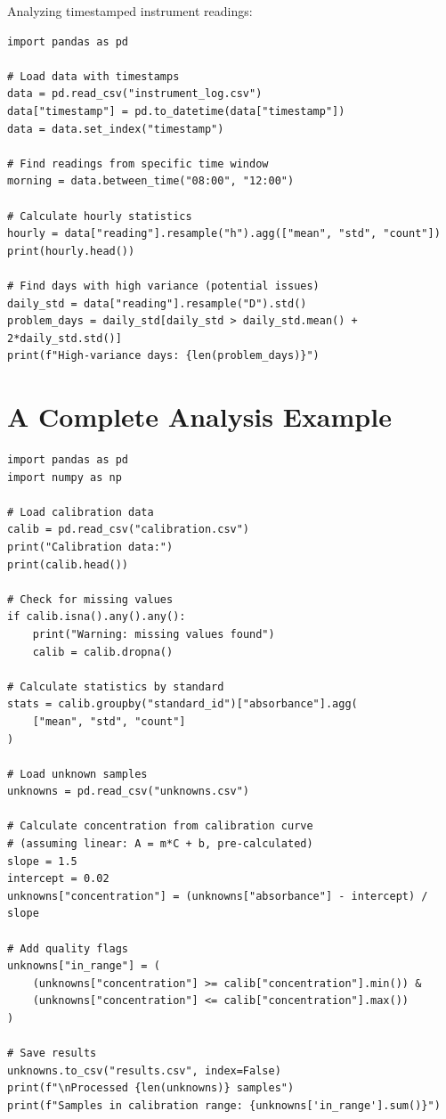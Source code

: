 \begin{labexample}
Analyzing timestamped instrument readings:

\begin{lstlisting}
import pandas as pd

# Load data with timestamps
data = pd.read_csv("instrument_log.csv")
data["timestamp"] = pd.to_datetime(data["timestamp"])
data = data.set_index("timestamp")

# Find readings from specific time window
morning = data.between_time("08:00", "12:00")

# Calculate hourly statistics
hourly = data["reading"].resample("h").agg(["mean", "std", "count"])
print(hourly.head())

# Find days with high variance (potential issues)
daily_std = data["reading"].resample("D").std()
problem_days = daily_std[daily_std > daily_std.mean() + 2*daily_std.std()]
print(f"High-variance days: {len(problem_days)}")
\end{lstlisting}
\end{labexample}

\section{A Complete Analysis Example}
\label{sec:pandas-example}

\begin{lstlisting}
import pandas as pd
import numpy as np

# Load calibration data
calib = pd.read_csv("calibration.csv")
print("Calibration data:")
print(calib.head())

# Check for missing values
if calib.isna().any().any():
    print("Warning: missing values found")
    calib = calib.dropna()

# Calculate statistics by standard
stats = calib.groupby("standard_id")["absorbance"].agg(
    ["mean", "std", "count"]
)

# Load unknown samples
unknowns = pd.read_csv("unknowns.csv")

# Calculate concentration from calibration curve
# (assuming linear: A = m*C + b, pre-calculated)
slope = 1.5
intercept = 0.02
unknowns["concentration"] = (unknowns["absorbance"] - intercept) / slope

# Add quality flags
unknowns["in_range"] = (
    (unknowns["concentration"] >= calib["concentration"].min()) &
    (unknowns["concentration"] <= calib["concentration"].max())
)

# Save results
unknowns.to_csv("results.csv", index=False)
print(f"\nProcessed {len(unknowns)} samples")
print(f"Samples in calibration range: {unknowns['in_range'].sum()}")
\end{lstlisting}

